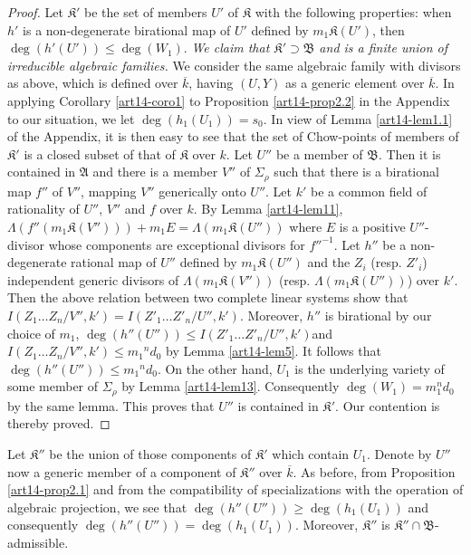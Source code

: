 \begin{proof}
Let $\mathfrak{K}'$ be the set of members $U'$ of $\mathfrak{K}$ with the following properties: when $h'$ is a non-degenerate birational map of $U'$ defined by $m_{1}\mathfrak{K}(U')$, then $\deg(h'(U'))\leq \deg(W_{1})$. {\em We claim that $\mathfrak{K}'\supset \mathfrak{B}$ and is a finite union of irreducible algebraic families.} We consider the same algebraic family with divisors as above, which is defined over $\overline{k}$, having $(U,Y)$ as a generic element over $\overline{k}$. In applying Corollary \ref{art14-coro1} to Proposition \ref{art14-prop2.2} in the Appendix to our situation, we let $\deg(h_{1}(U_{1}))=s_{0}$. In view of Lemma \ref{art14-lem1.1} of the Appendix, it is then easy to see that the set of Chow-points of members of $\mathfrak{K}'$ is a closed subset of that of $\mathfrak{K}$ over $k$. Let $U''$ be a member of $\mathfrak{B}$. Then it is contained in $\mathfrak{A}$ and there is a member $V''$ of $\Sigma_{\rho}$ such that there is a birational map $f''$ of $V''$, mapping $V''$ generically onto $U''$. Let $k'$ be a common field of rationality of $U''$, $V''$ and $f$ over $k$. By Lemma \ref{art14-lem11}, $\Lambda(f''(m_{1}\mathfrak{K}(V'')))+m_{1}E=\Lambda(m_{1}\mathfrak{K}(U''))$ where $E$ is a positive $U''$-divisor whose components are exceptional divisors for ${f''}^{-1}$. Let $h''$ be a non-degenerate rational map of $U''$ defined by $m_{1}\mathfrak{K}(U'')$ and the $Z_{i}$ (resp. $Z'_{i}$) independent generic divisors of $\Lambda(m_{1}\mathfrak{K}(V''))$ (resp. $\Lambda(m_{1}\mathfrak{K}(U''))$) over $k'$. Then the above relation between two complete linear systems show that $I(Z_{1}\ldots Z_{n}/V'',k')=I(Z'_{1}\ldots Z'_{n}/U'',k')$. Moreover, $h''$ is birational by our choice of $m_{1}$, $\deg(h''(U''))\leq I(Z'_{1}\ldots Z'_{n}/U'',k')$\pageoriginale and $I(Z_{1}\ldots Z_{n}/V'',k')\leq m_{1}{}^{n}d_{0}$ by Lemma \ref{art14-lem5}. It follows that $\deg(h''(U''))\leq m_{1}{}^{n}d_{0}$. On the other hand, $U_{1}$ is the underlying variety of some member of $\Sigma_{\rho}$ by Lemma \ref{art14-lem13}. Consequently $\deg(W_{1})=m^{n}_{1}d_{0}$ by the same lemma. This proves that $U''$ is contained in $\mathfrak{K}'$. Our contention is thereby proved.
\end{proof}

Let $\mathfrak{K}''$ be the union of those components of $\mathfrak{K}'$ which contain $U_{1}$. Denote by $U''$ now a generic member of a component of $\mathfrak{K}''$ over $\overline{k}$. As before, from Proposition \ref{art14-prop2.1} and from the compatibility of specializations with the operation of algebraic projection, we see that $\deg(h''(U''))\geq \deg (h_{1}(U_{1}))$ and consequently $\deg(h''(U''))=\deg (h_{1}(U_{1}))$. Moreover, $\mathfrak{K}''$ is $\mathfrak{K}''\cap \mathfrak{B}$-admissible.


